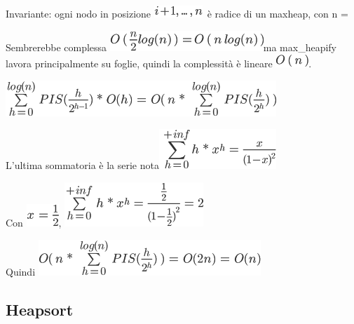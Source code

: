 \documentclass{article}
\begin{document}
{}

{Invariante: ogni nodo in posizione
}\includegraphics{images/image130.png}{~è radice di un maxheap, }{con n
= }

{}

{Sembrerebbe complessa }\includegraphics{images/image131.png}{ma
max\_heapify lavora principalmente su foglie, }{quindi la complessità è
lineare }\includegraphics{images/image132.png}{.}

{}

{}

\includegraphics{images/image133.png}

{L'ultima sommatoria è la serie
nota}\includegraphics{images/image134.png}

{Con }\includegraphics{images/image135.png}{,
}\includegraphics{images/image136.png}

{Quindi }\includegraphics{images/image137.png}

\hypertarget{h.vi4eu8p6i55e}{\subsection{\texorpdfstring{{Heapsort}}{Heapsort}}\label{h.vi4eu8p6i55e}}
\end{document}

